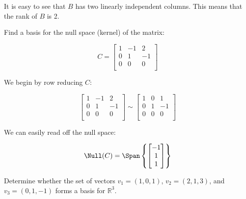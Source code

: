 \documentclass{zupan}
\begin{document}
\begin{solution}
  It is easy to see that $B$ has two linearly independent columns. This means
  that the rank of \(B\) is 2.
\end{solution}

\begin{problem}{3}
  Find a basis for the null space (kernel) of the matrix:

  \[
    C = \begin{bmatrix}
      1 & -1 & 2 \\
      0 & 1 & -1 \\
      0 & 0 & 0 \\
    \end{bmatrix}
  \]
\end{problem}

\begin{solution}
  We begin by row reducing \(C\):

  \[
    \begin{bmatrix}
      1 & -1 & 2 \\
      0 & 1 & -1 \\
      0 & 0 & 0 \\
    \end{bmatrix}
    \sim \begin{bmatrix}
      1 & 0 & 1 \\
      0 & 1 & -1 \\
      0 & 0 & 0 \\
    \end{bmatrix}
  \]

  We can easily read off the null space:

  \[
    \Null(C) = \Span\left\{
      \begin{bmatrix} -1 \\ 1 \\ 1 \end{bmatrix}
    \right\}
  \]
\end{solution}

\begin{problem}{4}
  Determine whether the set of vectors \(v_1 = (1, 0, 1)\), \(v_2 = (2, 1,
  3)\), and \(v_3 = (0, 1, -1)\) forms a basis for \(\mathbb{R}^3\).
\end{problem}
\end{document}
